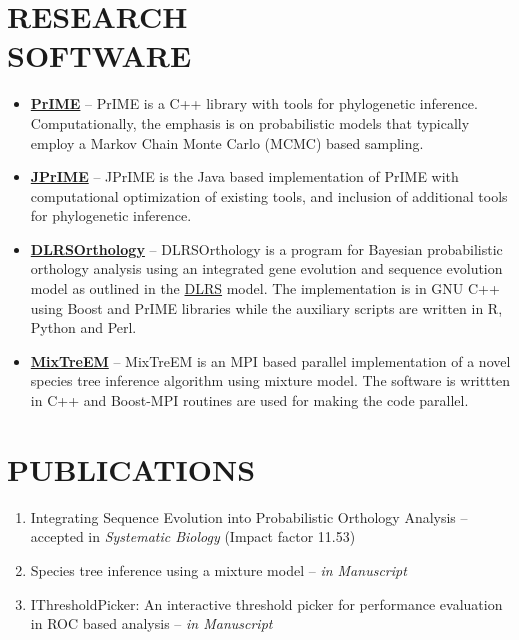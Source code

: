 \documentclass[margin, 10pt]{res} %
\begin{document}
\begin{resume}
\section{RESEARCH \\ SOFTWARE} 
\begin{itemize}
\item \textbf{\href{http://prime.scilifelab.se/}{PrIME}} -- PrIME is a C++ library with tools for phylogenetic inference. Computationally, the emphasis is on probabilistic models that typically employ a Markov Chain Monte Carlo (MCMC) based sampling.
\item \textbf{\href{https://code.google.com/p/jprime/}{JPrIME}} -- JPrIME is the Java based implementation of PrIME with computational optimization of existing tools, and inclusion of additional tools for phylogenetic inference.
\item \textbf{\href{http://prime.scilifelab.se/dlrsorthology/}{DLRSOrthology}} -- DLRSOrthology is a program for Bayesian probabilistic orthology analysis using an integrated gene evolution and sequence evolution model as outlined in the \href{http://www.pnas.org/content/106/14/5714.long}{DLRS} model. The implementation is in GNU C++ using Boost and PrIME libraries while the auxiliary scripts are written in R, Python and Perl.
\item \textbf{\href{http://prime.scilifelab.se/mixtreem/}{MixTreEM}} -- MixTreEM is an MPI based parallel implementation of a novel species tree inference algorithm using mixture model. The software is writtten in C++ and Boost-MPI routines are used for making the code parallel.
\end{itemize}


\section{PUBLICATIONS} 
\begin{enumerate}
\item Integrating Sequence Evolution into Probabilistic Orthology Analysis -- accepted in {\sl Systematic Biology} (Impact factor 11.53)
\item Species tree inference using a mixture model -- {\sl in Manuscript}
\item IThresholdPicker: An interactive threshold picker for performance evaluation in ROC based analysis -- {\sl in Manuscript}
\end{enumerate}



\end{resume}
\end{document}
